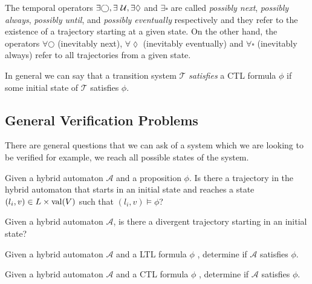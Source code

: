 The temporal operators $\exists\bigcirc, \exists\ \mathcal{U}, \exists\lozenge$ and $\exists\square$ are called \emph{possibly next}, \emph{possibly always}, \emph{possibly until}, and \emph{possibly eventually} respectively and they refer to the existence of a trajectory starting at a given state. On the other hand, the operators $\forall\bigcirc$ (inevitably next), $\forall\lozenge$ (inevitably eventually) and $\forall\square$ (inevitably always) refer to all trajectories from a given state.

In general we can say that a transition system $\mathcal{T}$ \emph{satisfies} a CTL formula $\phi$ if some initial state of $\mathcal{T}$ satisfies $\phi$.

\subsection{General Verification Problems}
There are general questions that we can ask of a system which we are looking to be verified for example, we reach all possible states of the system.

\begin{prob}
\label{prob:reach}
Given a hybrid automaton $\mathcal{A}$ and a proposition $\phi$. Is there a trajectory in the hybrid automaton that starts in an initial state and reaches a state $(l_{i},v)\in L\times\operatorname{val}(V)$ such that $(l_{i},v)\models\phi$?
\end{prob}

\begin{prob}
\label{prob:empty}
Given a hybrid automaton $\mathcal{A}$, is there a divergent trajectory starting in an initial state?
\end{prob}


\begin{prob}
\label{prob:ltl}
Given a hybrid automaton $\mathcal{A}$ and a LTL formula $\phi$ , determine if $\mathcal{A}$ satisfies $\phi$.
\end{prob}

\begin{prob}
\label{prob:ctl}
Given a hybrid automaton $\mathcal{A}$ and a CTL formula $\phi$ , determine if $\mathcal{A}$ satisfies $\phi$.
\end{prob}



